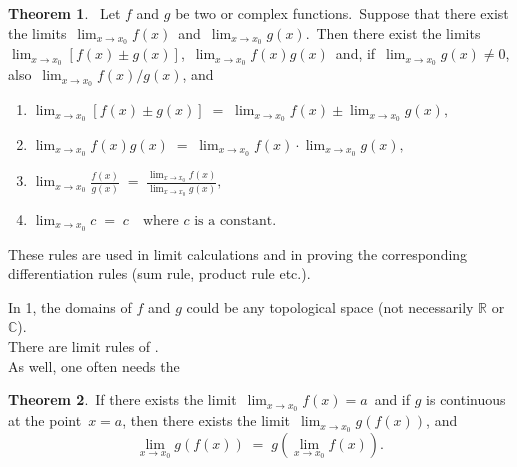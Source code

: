 \documentclass[12pt]{article}
\theoremstyle{definition}
\newtheorem{thmplain}{Theorem}
\begin{document}
\begin{thmplain}
 \, Let $f$ and $g$ be two  or complex functions.\, Suppose that there exist the limits \,$\lim_{x\to x_0}f(x)$\, and\, $\lim_{x\to x_0}g(x)$.\, Then there exist the limits\, $\lim_{x\to x_0}[f(x)\!\pm\!g(x)]$,\, $\lim_{x\to x_0}f(x)g(x)$\, and, if\, $\lim_{x\to x_0}g(x)\neq 0$,\, also\, $\lim_{x\to x_0}f(x)/g(x)$, and
\begin{enumerate}
\item $\lim_{x\to x_0}[f(x)\!\pm\!g(x)] 
\;=\; \lim_{x\to x_0}f(x)\pm\lim_{x\to x_0}g(x),$
\item $\lim_{x\to x_0}f(x)g(x) \;=\; \lim_{x\to x_0}f(x)\cdot\lim_{x\to x_0}g(x),$
\item $\lim_{x\to x_0}\frac{f(x)}{g(x)} \;=\; 
\frac{\lim_{x\to x_0}f(x)}{\lim_{x\to x_0}g(x)},$
\item $\lim_{x\to x_0}c \;=\; c
\quad\mathrm{where}\,\,c\,\,\mathrm{is\,\,a\,\,constant}.$
\end{enumerate}
\end{thmplain}

These rules are used in limit calculations and in proving the corresponding differentiation rules (sum rule, product rule etc.). 

In  1, the domains of $f$ and $g$ could be any topological space (not necessarily $\mathbb{R}$ or $\mathbb{C}$).\\

There are  limit rules of .\\

As well, one often needs the

\begin{thmplain}
 \,If there exists the limit\, $\lim_{x\to x_0}f(x) = a$\, and if $g$ is continuous at the point\, $x = a$, then there exists the limit\, $\lim_{x\to x_0}g(f(x))$, and 
           $$\lim_{x\to x_0}g(f(x)) \;=\; g(\lim_{x\to x_0}f(x)).$$
\end{thmplain}
\end{document}
